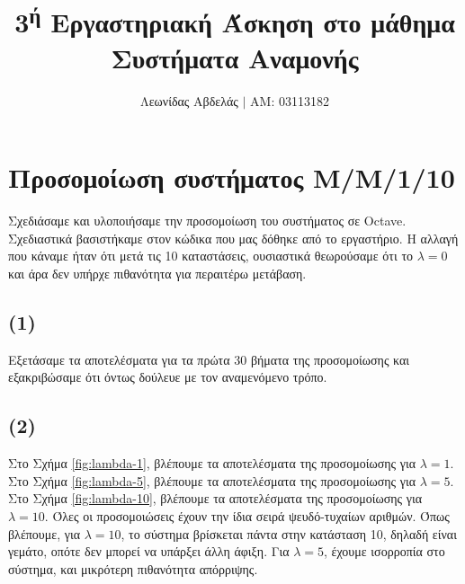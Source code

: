 \documentclass {article}
\title{3\textsuperscript{ή} Εργαστηριακή Άσκηση στο μάθημα
Συστήματα Αναμονής}
\author{Λεωνίδας Αβδελάς $|$ AM: 03113182}
\date{}
\newcommand{\english}[1]{\foreignlanguage{english}{#1}}
\begin{document}

\maketitle


\section*{Προσομοίωση συστήματος Μ/Μ/1/10}

Σχεδιάσαμε και υλοποιήσαμε την προσομοίωση του συστήματος σε \english{Octave}. Σχεδιαστικά βασιστήκαμε στον κώδικα που μας δόθηκε από το εργαστήριο. Η αλλαγή που κάναμε ήταν ότι μετά τις 10 καταστάσεις, ουσιαστικά θεωρούσαμε ότι το $λ = 0$ και άρα δεν υπήρχε πιθανότητα για περαιτέρω μετάβαση. 

\subsection*{(1)}

Εξετάσαμε τα αποτελέσματα για τα πρώτα 30 βήματα της προσομοίωσης και εξακριβώσαμε ότι όντως δούλευε με τον αναμενόμενο τρόπο.

\subsection*{(2)}

Στο Σχήμα \ref{fig:lambda-1}, βλέπουμε τα αποτελέσματα της προσομοίωσης για $λ=1$. Στο Σχήμα \ref{fig:lambda-5}, βλέπουμε τα αποτελέσματα της προσομοίωσης για $λ=5$. Στο Σχήμα \ref{fig:lambda-10}, βλέπουμε τα αποτελέσματα της προσομοίωσης για $λ=10$. Όλες οι προσομοιώσεις έχουν την ίδια σειρά ψευδό-τυχαίων αριθμών. Όπως βλέπουμε, για $λ=10$, το σύστημα βρίσκεται πάντα στην κατάσταση 10, δηλαδή είναι γεμάτο, οπότε δεν μπορεί να υπάρξει άλλη άφιξη.
Για $λ=5$, έχουμε ισορροπία στο σύστημα, και μικρότερη πιθανότητα απόρριψης.
\end{document}
